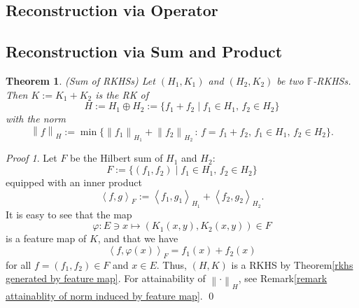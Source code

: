 \documentclass[a4paper,12pt]{article}
\newtheorem{thm}{Theorem}[section]
\theoremstyle{remark}
\newtheorem*{prf}{Proof}
\theoremstyle{definition}
\theoremstyle{definition}
\theoremstyle{definition}
\newcommand{\ip}[2]{\left<#1, #2 \right>}
\newcommand{\norm}[1]{\left\| #1 \right\|}
\begin{document}
\subsection{Reconstruction via Operator}
\subsection{Reconstruction via Sum and Product}

\begin{thm} (Sum of RKHSs)
	Let \( (H_1,K_1) \) and \( (H_2,K_2) \) be two \( \mathbb{F} \)-RKHSs.
	Then \( K:= K_1 + K_2 \) is the RK of
	\begin{equation*}
		H:= H_1 \oplus H_2:= \{f_1 + f_2 \mid f_1 \in H_1, \, f_2 \in H_2\}
	\end{equation*}
	with the norm
	\begin{equation*}
		\norm{f}_H := \min \{\norm{f_1}_{H_1}+\norm{f_2}_{H_2} \,:\, f = f_1 + f_2,\,f_1 \in H_1,\,f_2 \in H_2\}.
	\end{equation*}
\end{thm}
\begin{prf}
	Let \( F \) be the Hilbert sum of \( H_1 \) and \( H_2 \):
	\begin{equation*}
		F := \{(f_1, f_2)\mid f_1 \in H_1,\, f_2 \in H_2\}
	\end{equation*}
	equipped with an inner product
	\begin{equation*}
		\ip{f}{g}_F := \ip{f_1}{g_1}_{H_1} + \ip{f_2}{g_2}_{H_2}.
	\end{equation*}
	It is easy to see that the map
	\begin{equation*}
		\varphi : E \ni x \mapsto \left( K_1(x,y), K_2(x,y) \right) \in F
	\end{equation*}
	is a feature map of \( K \), and that we have
	\begin{equation*}
		\ip{f}{\varphi(x)}_F = f_1(x)+f_2(x)
	\end{equation*}
	for all \( f = (f_1,f_2) \in F \) and \( x \in E \).
	Thus, \( (H,K) \) is a RKHS by Theorem\ref{rkhs generated by feature map}. For attainability of \( \norm{\cdot}_H \), see Remark\ref{remark attainablity of norm induced by feature map}.
	\qed\end{prf}
\end{document}
